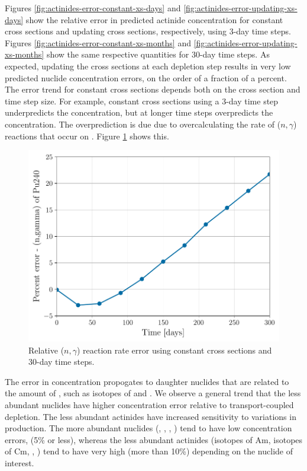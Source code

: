     Figures \ref{fig:actinides-error-constant-xs-days} and
    \ref{fig:actinides-error-updating-xs-days} show the relative error in
    predicted actinide concentration for constant cross sections and updating
    cross sections, respectively, using 3-day time steps. Figures
    \ref{fig:actinides-error-constant-xs-months} and
    \ref{fig:actinides-error-updating-xs-months} show the same respective
    quantities for 30-day time steps. As expected, updating the cross sections
    at each depletion step results in very low predicted nuclide concentration
    errors, on the order of a fraction of a percent. The error trend for
    constant cross sections depends both on the cross section and time step
    size. For example, constant cross sections using a 3-day time step
    underpredicts the  concentration, but at longer time steps
    overpredicts the concentration. The overprediction is due due to
    overcalculating the rate of ($n,\gamma$) reactions that occur on
    . Figure \ref{fig:pu240-n-gamma-months} shows this.

    \begin{figure}[htpb]
        \centering
        \includegraphics[width=\linewidth]{figs/pu240-n-gamma-months.pdf}
        \caption{Relative  ($n,\gamma$) reaction rate error using
        constant cross sections and 30-day time steps.}
        \label{fig:pu240-n-gamma-months}
    \end{figure}

    The error in  concentration propogates to daughter nuclides
    that are related to the amount of , such as isotopes of 
    and . We observe a general trend that the less abundant
    nuclides have higher concentration error relative to transport-coupled
    depletion. The less abundant actinides have increased sensitivity to
    variations in production. The more abundant nuclides (,
    , , ) tend to have low concentration
    errors, (5\% or less), whereas the less abundant actinides (isotopes of Am,
    isotopes of Cm, , ) tend to have very high (more
    than 10\%) depending on the nuclide of interest.

